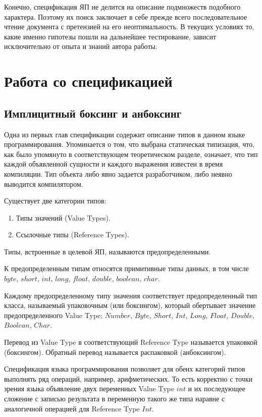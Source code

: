 \documentclass{mipt-thesis-bs}
\begin{document}
Конечно, спецификация ЯП не делится на описание подмножеств подобного характера. Поэтому их поиск 
заключает в себе прежде всего последовательное чтение документа с претензией на его неоптимальность.
В текущих условиях то, какие именно гипотезы пошли на дальнейшее тестирование, зависит
исключительно от опыта и знаний автора работы.

\section{Работа со спецификацией}

\subsection{Имплицитный боксинг и анбоксинг}

Одна из первых глав спецификации содержит описание типов в данном языке
программирования. Упоминается о том, что выбрана статическая типизация, что, как 
было упомянуто в соответствующем теоретическом разделе, означает, что тип 
каждой объявленной сущности и каждого выражения известен в
время компиляции. Тип объекта либо явно задается разработчиком, 
либо неявно выводится компилятором.

Существует две категории типов:
\begin{enumerate}
    \item Типы значений (Value Types).
    \item Ссылочные типы (Reference Types).
\end{enumerate}

Типы, встроенные в целевой ЯП, называются предопределенными.

К предопределенным типам относятся примитивные типы данных, в том числе 
$byte$, $short$, $int$, $long$, $float$, $double$, $boolean$, $char$.

Каждому предопределенному типу значения соответствует 
предопределенный тип класса, называемый 
упаковочным (или боксингом), который обертывает значение предопределенного 
Value Type: $Number$, $Byte$, $Short$, $Int$, $Long$, $Float$, $Double$, $Boolean$, $Char$.

Перевод из Value Type в соответствующий Reference Type называется упаковкой
(боксингом). Обратный перевод называется распаковкой (анбоксингом).

Спецификация языка программирования позволяет для обеих категорий типов выполнять ряд
операций, например, арифметических. То есть корректно с точки зрения языка
объявление двух переменных Value Type $int$ и их последующее сложение с записью
результата в переменную такого же типа наравне с аналогичной операцией для Reference Type $Int$.
\end{document}
